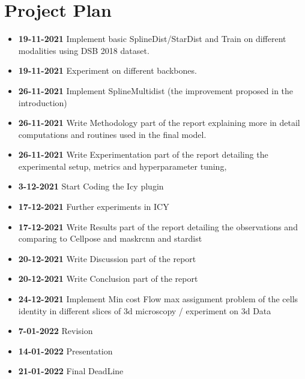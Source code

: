 \documentclass[a4paper, 12pt]{report}
\begin{document}
% 

\tableofcontents
\listoffigures
\listoftables

\newpage












\chapter{Project Plan}
\begin{itemize}
    \item \textbf{19-11-2021} Implement basic SplineDist/StarDist and Train on different modalities using DSB 2018 dataset.
    \item \textbf{19-11-2021} Experiment on different backbones.
    \item \textbf{26-11-2021} Implement SplineMultidist (the improvement proposed in the introduction)
    \item \textbf{26-11-2021} Write Methodology part of the report explaining more in detail computations and routines used in the final model.
    \item \textbf{26-11-2021} Write Experimentation part of the report detailing the experimental setup, metrics and hyperparameter tuning, 
    \item \textbf{3-12-2021} Start Coding the Icy plugin
    \item \textbf{17-12-2021} Further experiments in ICY
    \item \textbf{17-12-2021} Write Results part of the report detailing the observations and comparing to Cellpose and maskrcnn and stardist
    \item \textbf{20-12-2021} Write Discussion part of the report
    \item \textbf{20-12-2021} Write Conclusion part of the report
    \item \textbf{24-12-2021} Implement Min cost Flow max assignment problem of the cells identity in different slices of 3d microscopy / experiment on 3d Data
    \item \textbf{7-01-2022} Revision
    \item \textbf{14-01-2022} Presentation
    \item \textbf{21-01-2022} Final DeadLine
\end{itemize}



\newpage





% 
\end{document}
